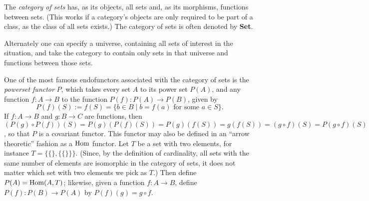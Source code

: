 \documentclass{article}
\begin{document}
The {\em category of sets} has, as its objects, all sets and, 
as its morphisms, functions between sets.  (This works if a 
category's objects are only required to be part of a class, 
as the class of all sets exists.)  The category of sets is often denoted by \textbf{Set}.

Alternately one can specify a universe, containing all sets 
of interest in the situation, and take the category to contain 
only sets in that universe and functions between those sets.

One of the most famous endofunctors associated with the category of sets 
is the \emph{powerset functor} $P$, which takes every set $A$ to its 
power set $P(A)$, and any function $f:A\to B$ to the function 
$P(f): P(A)\to P(B)$, given by 
\[
 P(f)(S) := f(S) = \lbrace b\in B\mid b = 
 f(a)\mbox{ for some }a\in S\rbrace.
\]
If $f \colon A\to B$ and $g \colon B\to C$ are functions, then $(P(g)\circ P(f))(S) = 
P(g)(P(f)(S)) = P(g)(f(S))=g(f(S))= (g\circ f)(S)=P(g\circ f)(S)$, 
so that $P$ is a covariant functor.  This functor may also be defined
in an ``arrow theoretic'' fashion as a ${\rm Hom}$ functor.  Let $T$
be a set with two elements, for instance $T = \{ \{\}, \{\{\}\}\}$.
(Since, by the definition of cardinality, all sets with the same 
number of elements are isomorphic in the category of sets, it does
not matter which set with two elements we pick as $T$.) 
Then define $P(A) = {\rm Hom} (A,T)$; likewise, given a function
$f \colon A \to B$, define $P(f) \colon P(B) \to P(A)$ by
$P(f)(g) = g \circ f$.
\end{document}
